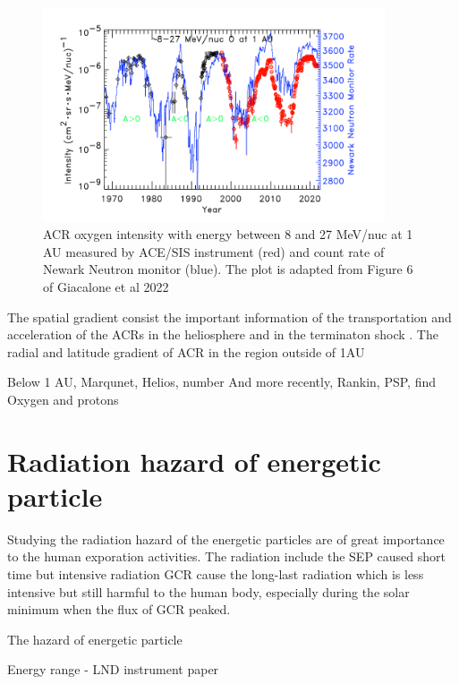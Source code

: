 \begin{figure}
	\centering
	\includegraphics[width = 0.9\textwidth]{images/ACR_solarmodulation.png}
	\caption{ACR oxygen intensity with energy between 8 and 27 MeV/nuc at 1 AU measured by ACE/SIS instrument (red) and count rate of Newark Neutron monitor (blue). The plot is adapted from Figure 6 of Giacalone et al 2022}
	\label{Fig:ACR_solarmodulation}
\end{figure}

The spatial gradient consist the important information of the transportation and acceleration of the ACRs in the heliosphere and in the terminaton shock \cite{Rankin 2020}. 
The radial and latitude gradient of ACR in the region outside of 1AU

Below 1 AU, Marqunet, Helios, number 
And more recently, Rankin, PSP, find Oxygen and protons

\section{Radiation hazard of energetic particle}

Studying the radiation hazard of the energetic particles are of great importance to the human exporation activities.
The radiation include the SEP caused short time but intensive radiation
GCR cause the long-last radiation which is less intensive but still harmful to the human body, especially during the solar minimum when the flux of GCR peaked.

The hazard of energetic particle 

Energy range - LND instrument paper

